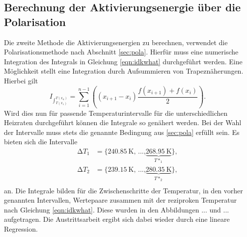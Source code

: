 \subsection{Berechnung der Aktivierungsenergie über die Polarisation}
Die zweite Methode die Aktivierungsenergien zu berechnen, verwendet die Polarisationsmethode nach Abschnitt \ref{sec:pola}. Hierfür muss eine numerische 
Integration des Integrals in Gleichung \eqref{eqn:idkwhat} durchgeführt werden. Eine Möglichkeit stellt eine Integration durch
Aufsummieren von Trapeznäherungen. Hierbei gilt 
\begin{equation}
I_{\int_{T(x_1)}^{T(x_n)}} = \sum_{i=1}^{n-1} \left( (x_{i+1} - x_{i}) \frac{f(x_{i+1}) + f(x_{i})}{2}\right).
\end{equation}
Wird dies nun für passende Temperaturintervalle für die unterschiedlichen Heizraten durchgeführt können die Integrale so genähert werden.
Bei der Wahl der Intervalle muss stets die genannte Bedingung aus \ref{sec:pola} erfüllt sein. Es bieten sich die Intervalle
\begin{align*}
\increment T_1 &= \{\SI{240.85}{\kelvin}\text{, ...,} \underbrace{\SI{268.95}{\kelvin}}_{T*_1}\}, \\
\increment T_2 &= \{\SI{239.15}{\kelvin}\text{, ...,} \underbrace{\SI{280.35}{\kelvin}}_{T*_2}\}, \\
\end{align*}
an. Die Integrale bilden für die Zwischenschritte der Temperatur, in den vorher genannten Intervallen, Wertepaare zusammen mit der reziproken Temperatur nach 
Gleichung \eqref{eqn:idkwhat}. Diese wurden in den Abbildungen ... und ... aufgetragen. Die Austrittsarbeit ergibt sich dabei wieder durch eine lineare 
Regression.
